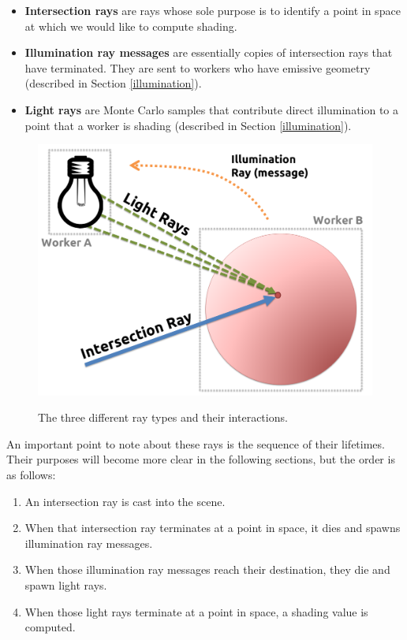 \documentclass[12pt]{ucthesis}
\newcommand{\captionfonts}{\small\bf\ssp}
\begin{document}
\begin{itemize}
   \item \textbf{Intersection rays} are rays whose sole purpose is to identify
      a point in space at which we would like to compute shading.
   \item \textbf{Illumination ray messages} are essentially copies of intersection
      rays that have terminated. They are sent to workers who have emissive
      geometry (described in Section \ref{illumination}).
   \item \textbf{Light rays} are Monte Carlo samples that contribute direct
      illumination to a point that a worker is shading (described in Section
      \ref{illumination}).
\end{itemize}

\begin{figure}[h!]
    \centering
    \includegraphics[width=120mm]{figures/raytypes.png}
    \captionfonts
    \caption{The three different ray types and their interactions.}
    \label{fig:raytypes}
\end{figure}

An important point to note about these rays is the sequence of their lifetimes.
Their purposes will become more clear in the following sections, but the order
is as follows:

\begin{enumerate}
   \item An intersection ray is cast into the scene.
   \item When that intersection ray terminates at a point in space, it dies and
      spawns illumination ray messages.
   \item When those illumination ray messages reach their destination, they die and
      spawn light rays.
   \item When those light rays terminate at a point in space, a shading value
      is computed.
\end{enumerate}
\end{document}
